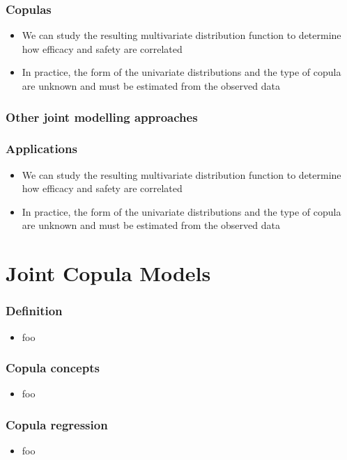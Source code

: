\documentclass{beamer}
\begin{document}
	\begin{frame}
		\frametitle{Copulas}
		\begin{itemize}
		\setlength\itemsep{2em}
		\item We can study the resulting multivariate distribution function to determine how efficacy and safety are correlated
		\item In practice, the form of the univariate distributions and the type of copula are unknown and must be estimated from the observed data
		\end{itemize}
	\end{frame}
		

	\begin{frame}
		\frametitle{Other joint modelling approaches} 
	\end{frame}	


	\begin{frame}
		\frametitle{Applications}
		\begin{itemize}
			\setlength\itemsep{2em}
			\item We can study the resulting multivariate distribution function to determine how efficacy and safety are correlated
			\item In practice, the form of the univariate distributions and the type of copula are unknown and must be estimated from the observed data
		\end{itemize}
	\end{frame}

\section{Joint Copula Models}

	\begin{frame}
		\frametitle{Definition}
		\begin{itemize}
			\setlength\itemsep{2em}
			\item foo
		\end{itemize}
	\end{frame}	


	\begin{frame}
		\frametitle{Copula concepts}
		\begin{itemize}
			\setlength\itemsep{2em}
			\item foo
		\end{itemize}
	\end{frame}	
	
	
	\begin{frame}
		\frametitle{Copula regression}
		\begin{itemize}
			\setlength\itemsep{2em}
			\item foo
		\end{itemize}
	\end{frame}	
		
\end{document}
